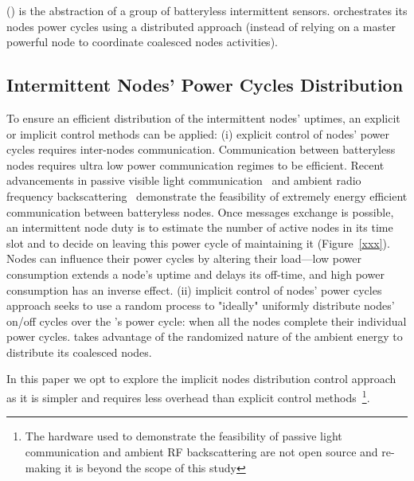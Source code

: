\fullsys (\sys) is the abstraction of a group of batteryless intermittent sensors. \sys orchestrates its nodes power cycles using a distributed approach (instead of relying on a master powerful node to coordinate coalesced nodes activities). 

\subsection{Intermittent Nodes' Power Cycles Distribution}
To ensure an efficient distribution of the intermittent nodes' uptimes, an explicit or implicit control methods can be applied: (i) explicit control of nodes' power cycles requires inter-nodes communication. Communication between batteryless nodes requires ultra low power communication regimes to be efficient. Recent advancements in passive visible light communication~\cite{Marco} and ambient radio frequency backscattering~\cite{} demonstrate the feasibility of extremely energy efficient communication between batteryless nodes. Once messages exchange is possible, an intermittent node duty is to estimate the number of active nodes in its time slot and to decide on leaving this power cycle of maintaining it (Figure~\ref{xxx}). Nodes can influence their power cycles by altering their load---low power consumption extends a node's uptime and delays its off-time, and high power consumption has an inverse effect. (ii) implicit control of nodes' power cycles approach seeks to use a random process to "ideally" uniformly distribute nodes' on/off cycles over the \sys's power cycle: when all the nodes complete their individual power cycles. \sys takes advantage of the randomized nature of the ambient energy to distribute its coalesced nodes. 

In this paper we opt to explore the implicit nodes distribution control approach as it is simpler and requires less overhead than explicit control methods~\footnote{The hardware used to demonstrate the feasibility of passive light communication and ambient RF backscattering are not open source and re-making it is beyond the scope of this study }.


